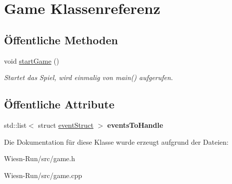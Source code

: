 \hypertarget{classGame}{\section{Game Klassenreferenz}
\label{classGame}
}
\subsection*{Öffentliche Methoden}
\begin{DoxyCompactItemize}
\item 
\hypertarget{classGame_ae8638ccdb0ef3bf39a6affa30aa1258f}{void \hyperlink{classGame_ae8638ccdb0ef3bf39a6affa30aa1258f}{start\-Game} ()}\label{classGame_ae8638ccdb0ef3bf39a6affa30aa1258f}

\begin{DoxyCompactList}\small\item\em Startet das Spiel, wird einmalig von main() aufgerufen. \end{DoxyCompactList}\end{DoxyCompactItemize}
\subsection*{Öffentliche Attribute}
\begin{DoxyCompactItemize}
\item 
\hypertarget{classGame_a14bc24b16362834be072dca921c8c154}{std\-::list$<$ struct \hyperlink{structeventStruct}{event\-Struct} $>$ {\bfseries events\-To\-Handle}}\label{classGame_a14bc24b16362834be072dca921c8c154}

\end{DoxyCompactItemize}


Die Dokumentation für diese Klasse wurde erzeugt aufgrund der Dateien\-:\begin{DoxyCompactItemize}
\item 
Wiesn-\/\-Run/src/game.\-h\item 
Wiesn-\/\-Run/src/game.\-cpp\end{DoxyCompactItemize}
